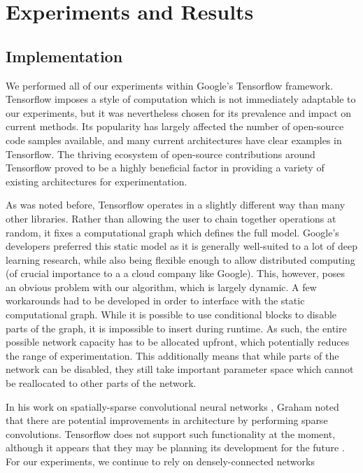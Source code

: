 \chapter{Experiments and Results}
\section{Implementation}
We performed all of our experiments within Google's Tensorflow \cite{abadi2016tensorflow} framework.
Tensorflow imposes a style of computation which is not immediately adaptable to our experiments, but it was nevertheless chosen for its prevalence and impact on current methods.
Its popularity has largely affected the number of open-source code samples available, and many current architectures have clear examples in Tensorflow.
The thriving ecosystem of open-source contributions around Tensorflow proved to be a highly beneficial factor in providing a variety of existing architectures for experimentation.

As was noted before, Tensorflow operates in a slightly different way than many other libraries.
Rather than allowing the user to chain together operations at random, it fixes a computational graph which defines the full model.
Google's developers preferred this static model as it is generally well-suited to a lot of deep learning research, while also being flexible enough to allow distributed computing (of crucial importance to a a cloud company like Google).
This, however, poses an obvious problem with our algorithm, which is largely dynamic.
A few workarounds had to be developed in order to interface with the static computational graph.
While it is possible to use conditional blocks to disable parts of the graph, it is impossible to insert during runtime.
As such, the entire possible network capacity has to be allocated upfront, which potentially reduces the range of experimentation.
This additionally means that while parts of the network can be disabled, they still take important parameter space which cannot be reallocated to other parts of the network.

In his work on spatially-sparse convolutional neural networks \cite{graham2014spatially}, Graham noted that there are potential improvements in architecture by performing sparse convolutions.
Tensorflow does not support such functionality at the moment, although it appears that they may be planning its development for the future \cite{spatiallysparseconv}.
For our experiments, we continue to rely on densely-connected networks


